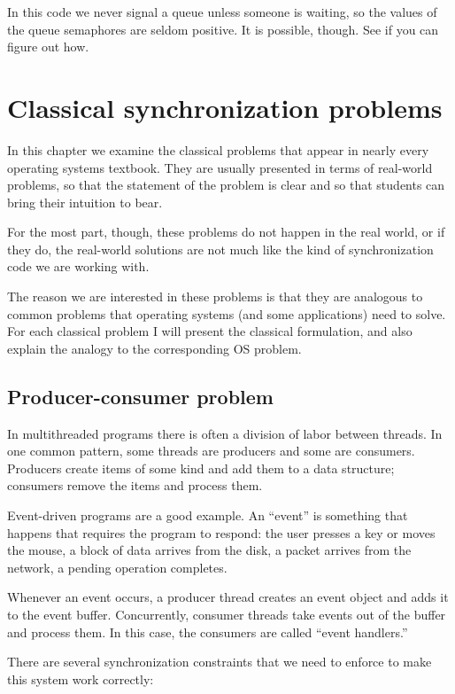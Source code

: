 \documentclass{book}
\newcommand{\clearemptydoublepage}{\newpage\cleardoublepage}
\begin{document}
In this code we never signal a queue unless someone is waiting,
so the values of the queue semaphores are seldom positive.
It is possible, though.  See if you can figure out how.


\clearemptydoublepage
\chapter{Classical synchronization problems}

In this chapter we examine the classical problems that appear
in nearly every operating systems textbook.  They
are usually presented in terms of real-world problems, so
that the statement of the problem is clear and so that students
can bring their intuition to bear.

For the most part, though, these problems do not happen in the
real world, or if they do, the real-world solutions are not much
like the kind of synchronization code we are working with.

The reason we are interested in these problems
is that they are analogous to common problems that operating
systems (and some applications) need to solve.  For each classical
problem I will present the classical formulation, and also explain
the analogy to the corresponding OS problem.


\section{Producer-consumer problem}

In multithreaded programs there is often a division of labor between
threads.  In one common pattern, some threads are producers and some
are consumers.  Producers create items of some kind and add them to a
data structure; consumers remove the items and process them.

Event-driven programs are a good example.  An ``event'' is something
that happens that requires the program to respond: the user presses a
key or moves the mouse, a block of data arrives from the disk, a
packet arrives from the network, a pending operation completes.

Whenever an event occurs, a producer thread creates an event
object and adds it to the event buffer.  Concurrently, consumer
threads take events out of the buffer and process them.
In this case, the consumers are called ``event handlers.''

There are several synchronization constraints that we need to
enforce to make this system work correctly:
\end{document}
